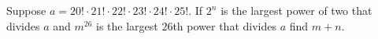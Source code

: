 Suppose $a=20!\cdot21!\cdot22!\cdot23!\cdot24!\cdot25!$. If $2^n$ is the largest power of two that divides $a$ and $m^{26}$ is the largest $26$th power that divides $a$ find $m+n$.
